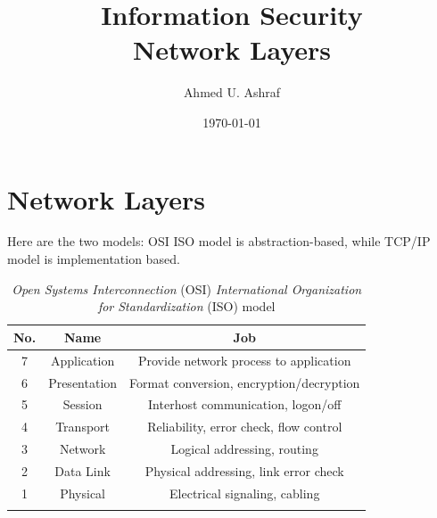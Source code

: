 \documentclass[a4paper, 12pt]{book} %
\title{Information Security \\ Network Layers}
\author{Ahmed U. Ashraf}
\date{\today }
\begin{document}
% 


\maketitle


\tableofcontents\label{toc}












\chapter{Network Layers}
Here are the two models: OSI ISO model is abstraction-based, while TCP/IP model is implementation based.
\begin{longtable}{|c|c|c|} \hline 
    
    No. & Name & Job \\ \hline 
   7 & Application & Provide network process to application \\ \hline 
   6 & Presentation & Format conversion, encryption/decryption \\ \hline 
   5 & Session & Interhost communication, logon/off \\ \hline 
   4 &  Transport & Reliability, error check, flow control \\ \hline 
   3 &  Network & Logical addressing, routing \\ \hline 
   2 & Data Link & Physical addressing, link error check \\ \hline 
   1 &  Physical & Electrical signaling, cabling \\ \hline   
   \caption{\emph{Open Systems Interconnection} (OSI)  \emph{International Organization for Standardization} (ISO) model}      
\end{longtable}
\end{document}
